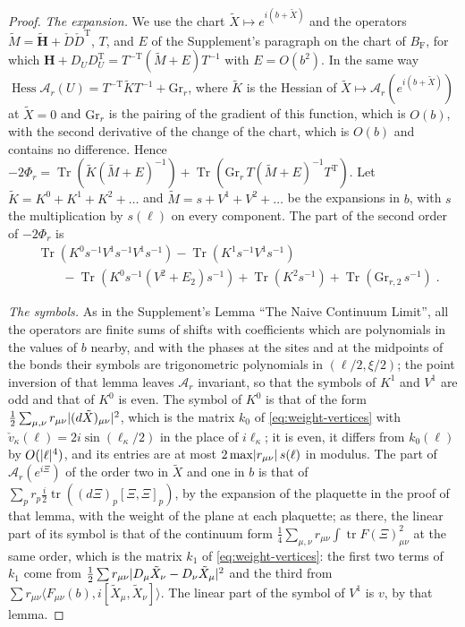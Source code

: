 \documentclass[11pt]{preprint}
\newcommand{\tr}{\operatorname{tr}}
\DeclarePairedDelimiter{\abs}{\lvert}{\rvert}
\numberwithin{equation}{section}
\theoremstyle{definition}
\theoremstyle{remark}
\theoremstyle{plain}
\begin{document}
\begin{proof}
\emph{The expansion.} We use the chart $\tilde X \mapsto e^{i(b + \tilde X)}$ and the operators $\tilde M = \tilde{\mathbf H} + \check D\check D^{\mathrm T}$, $T$, and $E$ of the Supplement's paragraph on the chart of $B_{\mathrm F}$, for which $\mathbf H + D_UD_U^{\mathrm T} = T^{-\mathrm T}(\tilde M + E)T^{-1}$ with $E = O(b^2)$. In the same way $\operatorname{Hess}\mathcal A_r(U) = T^{-\mathrm T}\tilde K T^{-1} + \mathrm{Gr}_r$, where $\tilde K$ is the Hessian of $\tilde X \mapsto \mathcal A_r(e^{i(b + \tilde X)})$ at $\tilde X = 0$ and $\mathrm{Gr}_r$ is the pairing of the gradient of this function, which is $O(b)$, with the second derivative of the change of the chart, which is $O(b)$ and contains no difference. Hence $-2\Phi_r = \operatorname{Tr}(\tilde K(\tilde M + E)^{-1}) + \operatorname{Tr}(\mathrm{Gr}_r\,T(\tilde M + E)^{-1}T^{\mathrm T})$. Let $\tilde K = K^0 + K^1 + K^2 + \dots$ and $\tilde M = s + V^1 + V^2 + \dots$ be the expansions in $b$, with $s$ the multiplication by $s(\ell)$ on every component. The part of the second order of $-2\Phi_r$ is
\begin{equation}\label{eq:weighted-expansion}
\begin{split}
    &\operatorname{Tr}(K^0s^{-1}V^1s^{-1}V^1s^{-1}) - \operatorname{Tr}(K^1s^{-1}V^1s^{-1})\\
    &\qquad- \operatorname{Tr}(K^0s^{-1}(V^2 + E_2)s^{-1}) + \operatorname{Tr}(K^2s^{-1}) + \operatorname{Tr}(\mathrm{Gr}_{r,2}\,s^{-1})\;.
\end{split}
\end{equation}

\emph{The symbols.} As in the Supplement's Lemma ``The Naive Continuum Limit'', all the operators are finite sums of shifts with coefficients which are polynomials in the values of $b$ nearby, and with the phases at the sites and at the midpoints of the bonds their symbols are trigonometric polynomials in $(\ell/2, \xi/2)$; the point inversion of that lemma leaves $\mathcal A_r$ invariant, so that the symbols of $K^1$ and $V^1$ are odd and that of $K^0$ is even. The symbol of $K^0$ is that of the form $\frac12\sum_{\mu,\nu}r_{\mu\nu}\abs{(d\tilde X)_{\mu\nu}}^2$, which is the matrix $k_0$ of \eqref{eq:weight-vertices} with $\check v_\kappa(\ell) = 2i\sin(\ell_\kappa/2)$ in the place of $i\ell_\kappa$; it is even, it differs from $k_0(\ell)$ by $O(\abs\ell^4)$, and its entries are at most $2\max\abs{r_{\mu\nu}}\,s(\ell)$ in modulus. The part of $\mathcal A_r(e^{i\Xi})$ of the order two in $\tilde X$ and one in $b$ is that of $\sum_pr_p\frac i2\tr((d\Xi)_p[\Xi, \Xi]_p)$, by the expansion of the plaquette in the proof of that lemma, with the weight of the plane at each plaquette; as there, the linear part of its symbol is that of the continuum form $\frac14\sum_{\mu,\nu}r_{\mu\nu}\int\tr F(\Xi)_{\mu\nu}^2$ at the same order, which is the matrix $k_1$ of \eqref{eq:weight-vertices}: the first two terms of $k_1$ come from $\frac12\sum r_{\mu\nu}\abs{D_\mu\tilde X_\nu - D_\nu\tilde X_\mu}^2$ and the third from $\sum r_{\mu\nu}\langle F_{\mu\nu}(b), i[\tilde X_\mu, \tilde X_\nu]\rangle$. The linear part of the symbol of $V^1$ is $v$, by that lemma.


\end{proof}
\end{document}

